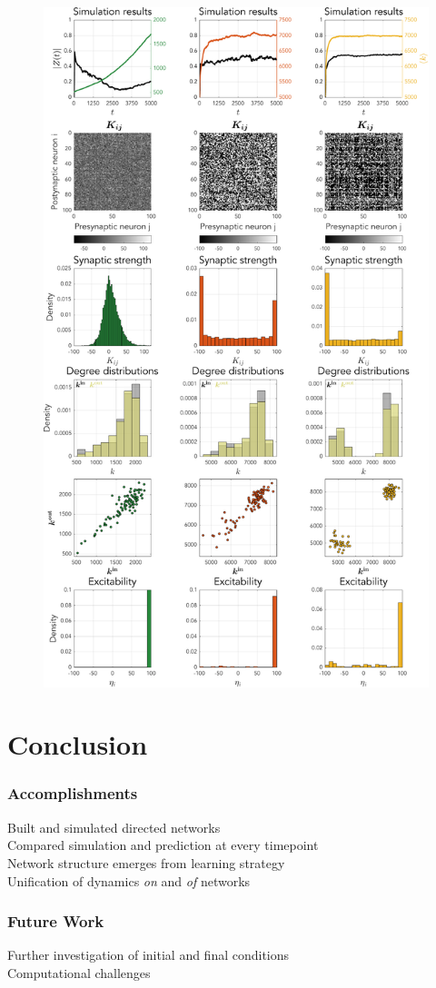 \begin{frame}
\begin{figure}[H]
\includegraphics[trim=0cm 13.3cm 0cm 22.7cm, clip=true, height = 0.45\textheight]{../Figures/Learning/STDPandIP.pdf}
\label{fig:STDP}
\end{figure}
\end{frame}



\section{Conclusion} 
\begin{frame}
\frametitle{Accomplishments}
\tabitem Built and simulated directed networks \\
\tabitem Compared simulation and prediction at every timepoint \\
\tabitem Network structure emerges from learning strategy \\
\tabitem Unification of dynamics \textsl{on} and \textsl{of} networks
\end{frame}

\begin{frame}
\frametitle{Future Work}
\tabitem Further investigation of initial and final conditions \\
\tabitem Computational challenges
\end{frame}

